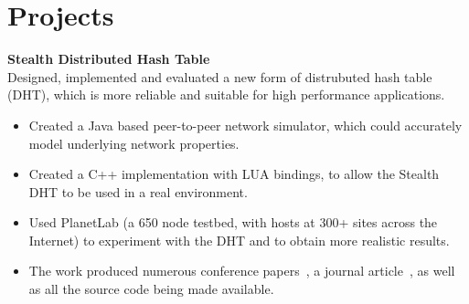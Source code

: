 \documentclass[a4paper,10pt]{article}
\begin{document}
% 
% 

\nocite{jakeman2009fna,faulkner2009epn,macquire2008acf,brampton2008cew,macquire2008asd,brampton2007cui,rai2007pmp,brampton2006sdh,macquire2006asd,macquire2006pas,brampton2005sdh}


\section{Projects}
 \textbf{Stealth Distributed Hash Table}\\
 Designed, implemented and evaluated a new form of distrubuted hash table (DHT), which is more reliable and suitable for high performance applications.

 \begin{itemize}
  \item Created a Java based peer-to-peer network simulator, which could accurately model underlying network properties.
  \item Created a C++ implementation with LUA bindings, to allow the Stealth DHT to be used in a real environment.
  \item Used PlanetLab (a 650 node testbed, with hosts at 300+ sites across the Internet) to experiment with the DHT and to obtain more realistic results.
  \item The work produced numerous conference papers~\cite{rai2007pmp, brampton2006sdh, macquire2006asd, macquire2006pas,  brampton2005sdh}, a journal article~\cite{macquire2008asd}, as well as all the source code being made available.
 \end{itemize}
\end{document}
